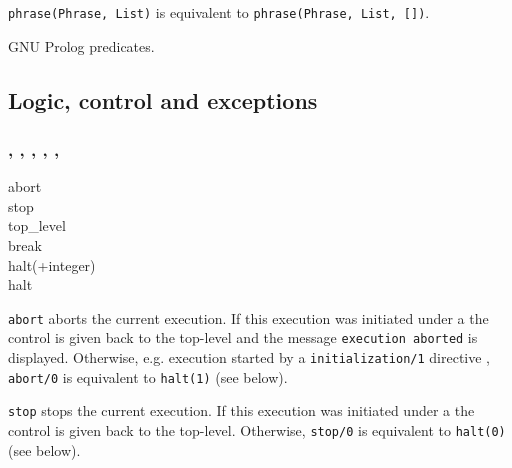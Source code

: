 \texttt{phrase(Phrase, List)} is equivalent to
\texttt{phrase(Phrase, List, [])}.

\begin{PlErrors}





\end{PlErrors}

\Portability

GNU Prolog predicates.

\subsection{Logic, control and exceptions}

\subsubsection{,\label{abort/0}
               ,
               ,
               ,
               ,
               }


\begin{TemplatesOneCol}
abort\\
stop\\
top\_level\\
break\\
halt(+integer)\\
halt

\end{TemplatesOneCol}

\Description

\texttt{abort} aborts the current execution. If this execution was initiated
under a  the control is given back to the top-level and the
message \texttt{{\lb}execution aborted{\rb}} is displayed. Otherwise,
e.g. execution started by a \texttt{initialization/1} directive
, \texttt{abort/0} is equivalent to
\texttt{halt(1)} (see below).

\texttt{stop} stops the current execution. If this execution was initiated
under a  the control is given back to the
top-level. Otherwise, \texttt{stop/0} is equivalent to \texttt{halt(0)}
(see below).

